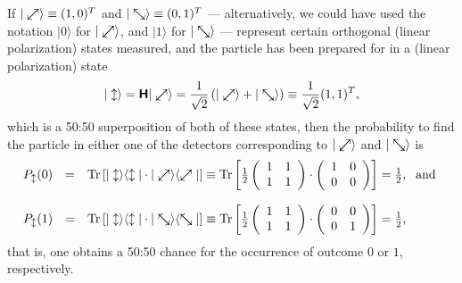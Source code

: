 \documentclass[10pt]{article}%
\begin{document}
If
$\vert \swarrow\mkern-18mu\nearrow \rangle \equiv (1,0)^T$ and
$\vert \searrow\mkern-18mu\nwarrow \rangle \equiv (0,1)^T$
--- alternatively, we could have used the notation $\vert 0 \rangle$  for $\vert \swarrow\mkern-18mu\nearrow \rangle$,
and $\vert 1 \rangle$  for $\vert \searrow\mkern-18mu\nwarrow \rangle$ ---
represent
certain orthogonal (linear polarization) states measured,
and the particle has been prepared for in a (linear polarization) state
\begin{equation}
\vert \updownarrow \rangle  =
\textsf{\textbf{H}} \vert \swarrow\mkern-18mu\nearrow \rangle =
\frac{1}{\sqrt{2}} \left( \vert \swarrow\mkern-18mu\nearrow \rangle
  + \vert \searrow\mkern-18mu\nwarrow  \rangle \right) \equiv \frac{1}{\sqrt{2}} (1,1)^T,
\end{equation}
which is a 50:50 superposition of both of these states,
then the probability to find the particle in either one of the detectors corresponding to
$\vert \swarrow\mkern-18mu\nearrow \rangle $ and
$\vert \searrow\mkern-18mu\nwarrow  \rangle $ is
\begin{equation}
\begin{array}{rcl}
P_\updownarrow (0)
&=&
\textrm{Tr} \left[
\vert \updownarrow \rangle \langle  \updownarrow \vert \cdot \vert \swarrow\mkern-18mu\nearrow \rangle \langle  \swarrow\mkern-18mu\nearrow \vert
\right]
\equiv
\textrm{Tr}
\left[
\frac{1}{2}\left(
\begin{array}{cc}
1&1\\
1&1
\end{array}
\right)
\cdot
\left(
\begin{array}{cc}
1&0\\
0&0
\end{array}
\right)
\right]
=\frac{1}{2},\;\textrm{
and }\\[4ex]
P_\updownarrow (1)&=&
\textrm{Tr} \left[
\vert \updownarrow \rangle \langle  \updownarrow \vert \cdot \vert \searrow\mkern-18mu\nwarrow  \rangle \langle   \searrow\mkern-18mu\nwarrow \vert
\right]
\equiv
\textrm{Tr}
\left[
\frac{1}{2}\left(
\begin{array}{cc}
1&1\\
1&1
\end{array}
\right)
\cdot
\left(
\begin{array}{cc}
0&0\\
0&1
\end{array}
\right)
\right]
=\frac{1}{2},
\end{array}
\end{equation}
that is, one obtains  a 50:50 chance for the occurrence of outcome $0$ or $1$, respectively.
\end{document}
